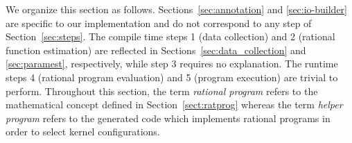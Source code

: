 We organize this section as follows.
Sections~\ref{sec:annotation} and \ref{sec:io-builder}
are specific to our implementation and do not
correspond to any step of Section~\ref{sec:steps}.
The compile time steps 1 (data collection) and 2 (rational function estimation)
are reflected in Sections~\ref{sec:data_collection}
and \ref{sec:paramest}, respectively, while step 3 requires no explanation.
The runtime steps 4 (rational program evaluation)
and 5 (program execution) are trivial to perform. 
Throughout this section,  the term {\em rational program}
refers to the mathematical concept defined in Section~\ref{sect:ratprog}
whereas the term {\em helper program} refers to the generated code
which implements rational programs in order to select kernel configurations.



%	

